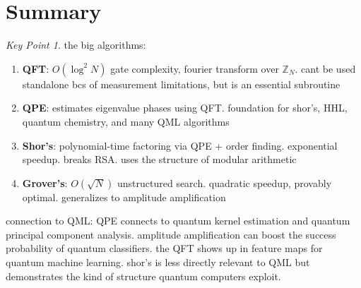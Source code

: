 \documentclass[11pt,a4paper]{article}
\theoremstyle{definition}
\theoremstyle{remark}
\newtheorem*{keypoint}{Key Point}
\begin{document}
\begin{center}
\end{center}

\section{Summary}

\begin{keypoint}
the big algorithms:
\begin{enumerate}
    \item \textbf{QFT}: $O(\log^2 N)$ gate complexity, fourier transform over $\mathbb{Z}_N$. cant be used standalone bcs of measurement limitations, but is an essential subroutine
    \item \textbf{QPE}: estimates eigenvalue phases using QFT. foundation for shor's, HHL, quantum chemistry, and many QML algorithms
    \item \textbf{Shor's}: polynomial-time factoring via QPE + order finding. exponential speedup. breaks RSA. uses the structure of modular arithmetic
    \item \textbf{Grover's}: $O(\sqrt{N})$ unstructured search. quadratic speedup, provably optimal. generalizes to amplitude amplification
\end{enumerate}

connection to QML: QPE connects to quantum kernel estimation and quantum principal component analysis. amplitude amplification can boost the success probability of quantum classifiers. the QFT shows up in feature maps for quantum machine learning. shor's is less directly relevant to QML but demonstrates the kind of structure quantum computers exploit.
\end{keypoint}
\end{document}
